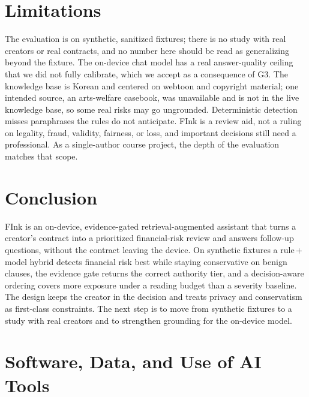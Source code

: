 \documentclass{article}
\theoremstyle{plain}
\begin{document}
\section{Limitations}
\label{sec:limitations}

The evaluation is on synthetic, sanitized fixtures; there is no study with real
creators or real contracts, and no number here should be read as generalizing
beyond the fixture. The on-device chat model has a real answer-quality ceiling
that we did not fully calibrate, which we accept as a consequence of G3. The
knowledge base is Korean and centered on webtoon and copyright material; one
intended source, an arts-welfare casebook, was unavailable and is not in the live
knowledge base, so some real risks may go ungrounded. Deterministic detection
misses paraphrases the rules do not anticipate. FInk is a review aid, not a ruling
on legality, fraud, validity, fairness, or loss, and important decisions still
need a professional. As a single-author course project, the depth of the
evaluation matches that scope.

\section{Conclusion}
\label{sec:conclusion}

FInk is an on-device, evidence-gated retrieval-augmented assistant that turns a
creator's contract into a prioritized financial-risk review and answers follow-up
questions, without the contract leaving the device. On synthetic fixtures a
rule\,+\,model hybrid detects financial risk best while staying conservative on
benign clauses, the evidence gate returns the correct authority tier, and a
decision-aware ordering covers more exposure under a reading budget than a
severity baseline. The design keeps the creator in the decision and treats privacy
and conservatism as first-class constraints. The next step is to move from
synthetic fixtures to a study with real creators and to strengthen grounding for
the on-device model.

\section*{Software, Data, and Use of AI Tools}
\end{document}
